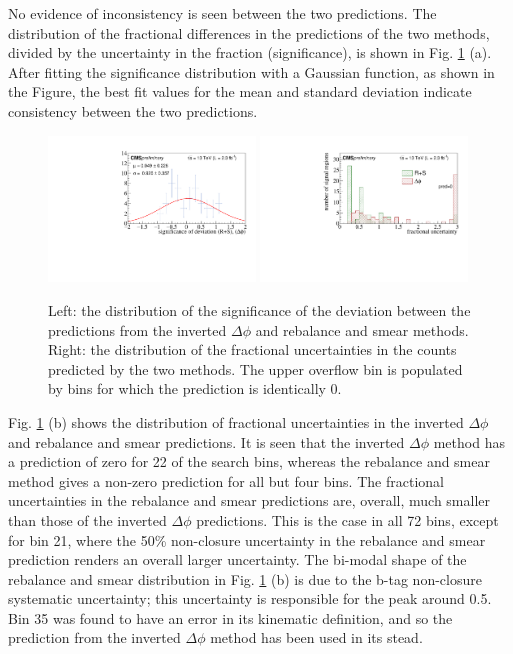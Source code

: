 No evidence of inconsistency is seen between the two predictions. The distribution of the fractional differences in the predictions of the two methods, divided by the uncertainty in the fraction (significance), is shown in Fig. \ref{fig:fractionalUnc} (a). After fitting the significance distribution  with a Gaussian function, as shown in the Figure, the best fit values for the mean and standard deviation indicate consistency between the two predictions.
\begin{figure}[tb!]
\centering
\includegraphics[width=0.49\textwidth]{figures/SusySearches/Ra2b2015/FractionalUncertainty.pdf}
\includegraphics[width=0.49\textwidth]{figures/SusySearches/Ra2b2015/FracUnc.pdf}
\caption{Left: the distribution of the significance of the deviation between the predictions from the inverted $\Delta\phi$ and rebalance and smear methods. Right: the distribution of the fractional uncertainties in the counts predicted by the two methods. The upper overflow bin is populated by bins for which the prediction is identically 0. }
\label{fig:fractionalUnc}
\end{figure}
Fig. \ref{fig:fractionalUnc} (b) shows the distribution of fractional uncertainties in the inverted $\Delta\phi$ and rebalance and smear predictions. It is seen that the inverted $\Delta\phi$ method has a prediction of zero for 22 of the search bins, whereas the rebalance and smear method gives a non-zero prediction for all but four bins. The fractional uncertainties in the rebalance and smear predictions are, overall, much smaller than those of the inverted $\Delta\phi$ predictions. This is the case in all 72 bins, except for bin 21, where the 50\% non-closure uncertainty in the rebalance and smear prediction renders an overall larger uncertainty. The bi-modal shape of the rebalance and smear distribution in Fig. \ref{fig:fractionalUnc} (b) is due to the b-tag non-closure systematic uncertainty; this uncertainty is responsible for the peak around 0.5.  Bin 35 was found to have an error in its kinematic definition, and so the prediction from the inverted $\Delta\phi$ method has been used in its stead.



